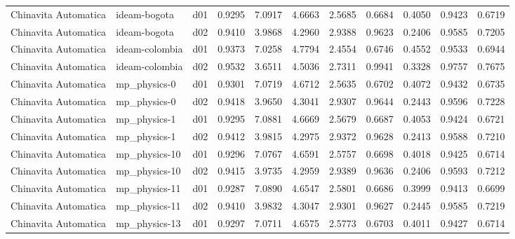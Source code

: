 \begin{longtable}{lllrrrrrrrr}
 Chinavita Automatica  &          ideam-bogota &     d01 &   0.9295 &   7.0917 &   4.6663 &       2.5685 &        0.6684 &       0.4050 &           0.9423 &  0.6719 \\
 Chinavita Automatica  &          ideam-bogota &     d02 &   0.9410 &   3.9868 &   4.2960 &       2.9388 &        0.9623 &       0.2406 &           0.9585 &  0.7205 \\
 Chinavita Automatica  &        ideam-colombia &     d01 &   0.9373 &   7.0258 &   4.7794 &       2.4554 &        0.6746 &       0.4552 &           0.9533 &  0.6944 \\
 Chinavita Automatica  &        ideam-colombia &     d02 &   0.9532 &   3.6511 &   4.5036 &       2.7311 &        0.9941 &       0.3328 &           0.9757 &  0.7675 \\
 Chinavita Automatica  &          mp\_physics-0 &     d01 &   0.9301 &   7.0719 &   4.6712 &       2.5635 &        0.6702 &       0.4072 &           0.9432 &  0.6735 \\
 Chinavita Automatica  &          mp\_physics-0 &     d02 &   0.9418 &   3.9650 &   4.3041 &       2.9307 &        0.9644 &       0.2443 &           0.9596 &  0.7228 \\
 Chinavita Automatica  &          mp\_physics-1 &     d01 &   0.9295 &   7.0881 &   4.6669 &       2.5679 &        0.6687 &       0.4053 &           0.9424 &  0.6721 \\
 Chinavita Automatica  &          mp\_physics-1 &     d02 &   0.9412 &   3.9815 &   4.2975 &       2.9372 &        0.9628 &       0.2413 &           0.9588 &  0.7210 \\
 Chinavita Automatica  &         mp\_physics-10 &     d01 &   0.9296 &   7.0767 &   4.6591 &       2.5757 &        0.6698 &       0.4018 &           0.9425 &  0.6714 \\
 Chinavita Automatica  &         mp\_physics-10 &     d02 &   0.9415 &   3.9735 &   4.2959 &       2.9389 &        0.9636 &       0.2406 &           0.9593 &  0.7212 \\
 Chinavita Automatica  &         mp\_physics-11 &     d01 &   0.9287 &   7.0890 &   4.6547 &       2.5801 &        0.6686 &       0.3999 &           0.9413 &  0.6699 \\
 Chinavita Automatica  &         mp\_physics-11 &     d02 &   0.9410 &   3.9832 &   4.3047 &       2.9301 &        0.9627 &       0.2445 &           0.9585 &  0.7219 \\
 Chinavita Automatica  &         mp\_physics-13 &     d01 &   0.9297 &   7.0711 &   4.6575 &       2.5773 &        0.6703 &       0.4011 &           0.9427 &  0.6714 \\

\end{longtable}
